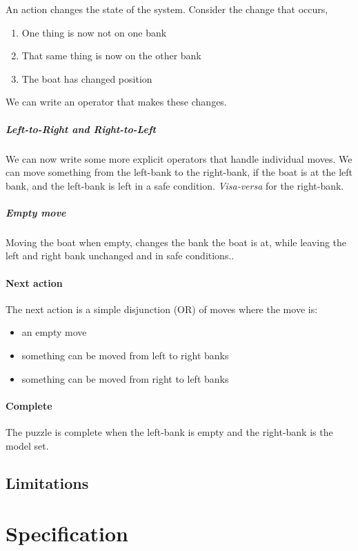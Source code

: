 \documentclass{article}
\begin{document}
An action changes the state of the system.  Consider the change that occurs,
\begin{enumerate}
	\item One thing is now not on one bank
	\item That same thing is now on the other bank
	\item The boat has changed position
\end{enumerate}

We can write an operator that makes these changes.

\subparagraph{Left-to-Right and Right-to-Left}
We can now write some more explicit operators that handle individual moves.
We can move something from the left-bank to the right-bank, if the boat is at
the left bank, and the left-bank is left in a safe condition.
\emph{Visa-versa} for the right-bank.

\subparagraph{Empty move} Moving the boat when empty, changes the bank the
boat is at, while leaving the left and right bank unchanged and in safe
conditions..  

\paragraph{Next action} The next action is a simple disjunction (OR) of moves
where the move is:
\begin{itemize}
	\item an empty move
	\item something can be moved from left to right banks
	\item something can be moved from right to left banks
\end{itemize}

\paragraph{Complete} The puzzle is complete when the left-bank is empty and
the right-bank is the model set.

\subsection{Limitations}


\section{Specification}
\end{document}
